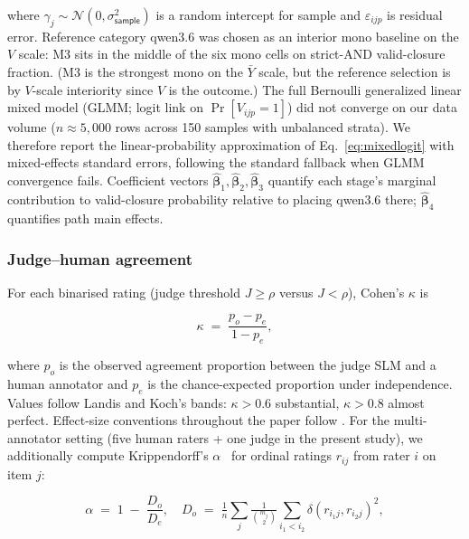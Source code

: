 where $\gamma_j \sim \mathcal{N}(0, \sigma_{\textsf{sample}}^2)$ is a random intercept for sample and $\varepsilon_{ijp}$ is residual error. Reference category qwen3.6 was chosen as an interior mono baseline on the $V$ scale: M3 sits in the middle of the six mono cells on strict-AND valid-closure fraction. (M3 is the strongest mono on the $\bar{Y}$ scale, but the reference selection is by $V$-scale interiority since $V$ is the outcome.) The full Bernoulli generalized linear mixed model (GLMM; logit link on $\Pr[V_{ijp} = 1]$) did not converge on our data volume ($n \approx 5{,}000$ rows across 150 samples with unbalanced strata). We therefore report the linear-probability approximation of Eq.~\ref{eq:mixedlogit} with mixed-effects standard errors, following the standard fallback when GLMM convergence fails. Coefficient vectors $\hat{\boldsymbol{\beta}}_1, \hat{\boldsymbol{\beta}}_2, \hat{\boldsymbol{\beta}}_3$ quantify each stage's marginal contribution to valid-closure probability relative to placing qwen3.6 there; $\hat{\boldsymbol{\beta}}_4$ quantifies path main effects.

\subsubsection{Judge--human agreement}

For each binarised rating (judge threshold $J \geq \rho$ versus $J < \rho$), Cohen's $\kappa$ is

\begin{equation}
  \kappa
  \;=\;
  \frac{p_o - p_e}{1 - p_e},
  \label{eq:kappa}
\end{equation}

where $p_o$ is the observed agreement proportion between the judge SLM and a human annotator and $p_e$ is the chance-expected proportion under independence. Values follow Landis and Koch's bands: $\kappa > 0.6$ substantial, $\kappa > 0.8$ almost perfect. Effect-size conventions throughout the paper follow \citet{Cohen2013StatPower}. For the multi-annotator setting (five human raters + one judge in the present study), we additionally compute Krippendorff's $\alpha$~\citep{Marzi2024KrippendorffAlpha} for ordinal ratings $r_{ij}$ from rater $i$ on item $j$:

\begin{equation}
  \alpha
  \;=\;
  1 \;-\; \frac{D_o}{D_e},
  \quad
  D_o \;=\; \tfrac{1}{n}\sum_{j} \tfrac{1}{\binom{m_j}{2}}
            \sum_{i_1 < i_2} \delta(r_{i_1 j}, r_{i_2 j})^2,
  \label{eq:alpha}
\end{equation}

